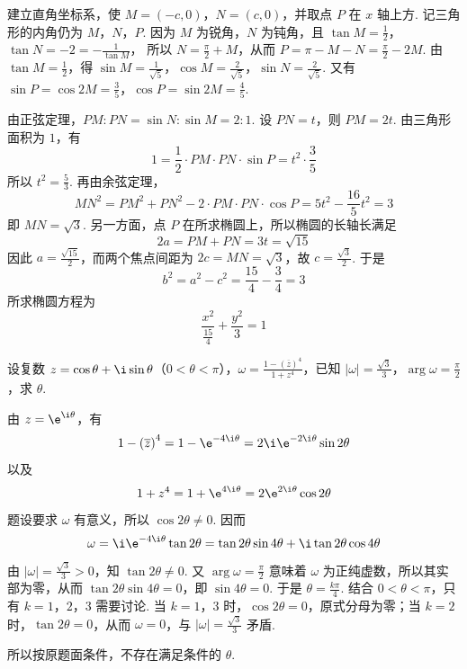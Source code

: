 \documentclass[UTF8,a4paper,oneside,11pt]{ctexbook}
\begin{document}
\begin{solution}
建立直角坐标系，使 \(M=(-c,0)\)，\(N=(c,0)\)，并取点 \(P\) 在 \(x\) 轴上方. 记三角形的内角仍为 \(M\)，\(N\)，\(P\). 因为 \(M\) 为锐角，\(N\) 为钝角，且
\(\tan M=\frac{1}{2}\)，\(\tan N=-2=-\frac{1}{\tan M}\)，
所以 \(N=\frac{\pi}{2}+M\)，从而 \(P=\pi-M-N=\frac{\pi}{2}-2M\).
由 \(\tan M=\frac{1}{2}\)，得 \(\sin M=\frac{1}{\sqrt{5}}\)，\(\cos M=\frac{2}{\sqrt{5}}\)，\(\sin N=\frac{2}{\sqrt{5}}\). 又有 \(\sin P=\cos 2M=\frac{3}{5}\)，\(\cos P=\sin 2M=\frac{4}{5}\).

由正弦定理，\(PM:PN=\sin N:\sin M=2:1\). 设 \(PN=t\)，则 \(PM=2t\). 由三角形面积为 \(1\)，有
\[
1=\frac{1}{2}\cdot PM\cdot PN\cdot\sin P=t^2\cdot\frac{3}{5}
\]
所以 \(t^2=\frac{5}{3}\). 再由余弦定理，
\[
MN^2=PM^2+PN^2-2\cdot PM\cdot PN\cdot\cos P
=5t^2-\frac{16}{5}t^2=3
\]
即 \(MN=\sqrt{3}\). 另一方面，点 \(P\) 在所求椭圆上，所以椭圆的长轴长满足
\[
2a=PM+PN=3t=\sqrt{15}
\]
因此 \(a=\frac{\sqrt{15}}{2}\)，而两个焦点间距为 \(2c=MN=\sqrt{3}\)，故 \(c=\frac{\sqrt{3}}{2}\). 于是
\[
b^2=a^2-c^2=\frac{15}{4}-\frac{3}{4}=3
\]
所求椭圆方程为
\[
\frac{x^2}{\frac{15}{4}}+\frac{y^2}{3}=1
\]
\end{solution}

\begin{problem}
设复数 \(z = \cos \theta + \i\sin \theta\)（\(0 < \theta < \pi\)），\(\omega = \frac{1 - \left( \overline{z} \right)^4}{1 + z^4}\)，已知 \(|\omega| = \frac{\sqrt{3}}{3}\)，\(\arg \omega = \frac{\pi}{2}\)，求 \(\theta\).
\end{problem}

\begin{solution}
由 \(z=\e^{\i\theta}\)，有
\[
1-\left(\overline z\right)^4=1-\e^{-4\i\theta}=2\i\e^{-2\i\theta}\sin 2\theta
\]
以及
\[
1+z^4=1+\e^{4\i\theta}=2\e^{2\i\theta}\cos 2\theta
\]
题设要求 \(\omega\) 有意义，所以 \(\cos 2\theta\ne0\). 因而
\[
\omega=\i\e^{-4\i\theta}\tan 2\theta
=\tan 2\theta\sin 4\theta+\i\tan 2\theta\cos 4\theta
\]
由 \(|\omega|=\frac{\sqrt{3}}{3}>0\)，知 \(\tan 2\theta\ne0\). 又 \(\arg\omega=\frac{\pi}{2}\) 意味着 \(\omega\) 为正纯虚数，所以其实部为零，从而
\(\tan 2\theta\sin 4\theta=0\)，即 \(\sin 4\theta=0\).
于是 \(\theta=\frac{k\pi}{4}\). 结合 \(0<\theta<\pi\)，只有 \(k=1\)，\(2\)，\(3\) 需要讨论. 当 \(k=1\)，\(3\) 时，\(\cos 2\theta=0\)，原式分母为零；当 \(k=2\) 时，\(\tan 2\theta=0\)，从而 \(\omega=0\)，与 \(|\omega|=\frac{\sqrt{3}}{3}\) 矛盾.

所以按原题面条件，不存在满足条件的 \(\theta\).
\end{solution}
\end{document}
